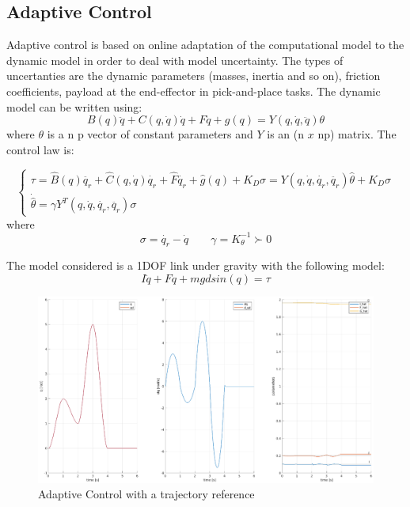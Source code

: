 \documentclass[a4paper,12pt]{article}
\begin{document}
\subsection{Adaptive Control}
Adaptive control is based on online adaptation of the computational model to the dynamic model in order to deal with model uncertainty. The types of uncertanties are the dynamic parameters (masses, inertia and so on), friction coefficients, payload at the end-effector in pick-and-place tasks. The dynamic model can be written using:
\[
    B(q)\ddot{q} + C(q,\dot{q})\dot{q} + F\dot{q} + g(q) = Y(q,\dot{q},\ddot{q})\theta
\]
where $\theta$ is a n p vector of constant parameters and $Y$ is an (n $x$ np) matrix. The control law is:

\[
    \begin{cases}
        \tau = \hat{B}(q)\ddot{q_r} + \hat{C}(q,\dot{q})\dot{q_r} + \hat{F}\dot{q_r} + \hat{g}(q) + K_D\sigma  = Y(q,\dot{q},\dot{q_r}, \ddot{q_r})\hat{\theta} + K_D\sigma\\
        \dot{\hat{\theta}} = \gamma Y^T(q,\dot{q},\dot{q_r}, \ddot{q_r})\sigma
        \end{cases}
\]
where 
\[
        \sigma = \dot{q_r} - \dot{q} \qquad \gamma = K_{\theta}^{-1} \succ 0
\]

The model considered is a 1DOF link under gravity with the following model:
\[
        I\ddot{q} + F\dot{q} + mgd sin(q) = \tau
\]

\begin{figure}[H]
    \begin{center}
        \hspace*{-4.5cm}
        \includegraphics[scale=0.5]{images/adaptive_traj.eps}
    \end{center}
    \caption{Adaptive Control with a trajectory reference}
    \label{fig:adaptive_trajectory}
\end{figure}
\end{document}
